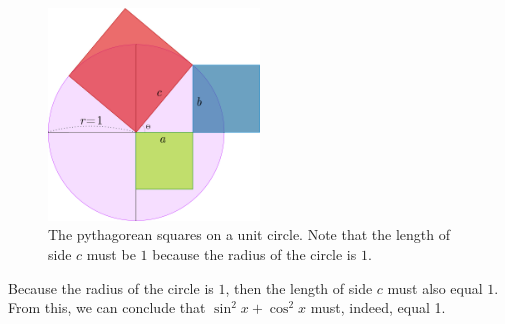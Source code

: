 \begin{figure}[h]
  \begin{center}
    \includegraphics[width=0.5\textwidth]{continuous/trig/pythcircle}
    \caption{The pythagorean squares on a unit circle. Note that the length of side $c$ must be $1$ because the radius of the circle is $1$.}
  \end{center}
  \label{fig:pythcircle}
\end{figure}
Because the radius of the circle is $1$, then the length of side $c$ must also equal $1$.
From this, we can conclude that $\sin^2x+\cos^2x$ must, indeed, equal 1.

